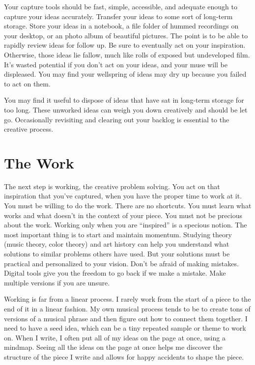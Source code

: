 \documentclass[
]{book}
\begin{document}
Your capture tools should be fast, simple, accessible, and adequate enough to capture your ideas accurately. Transfer your ideas to some sort of long-term storage. Store your ideas in a notebook, a file folder of hummed recordings on your desktop, or an photo album of beautiful pictures. The point is to be able to rapidly review ideas for follow up. Be sure to eventually act on your inspiration. Otherwise, those ideas lie fallow, much like rolls of exposed but undeveloped film. It's wasted potential if you don't act on your ideas, and your muse will be displeased. You may find your wellspring of ideas may dry up because you failed to act on them.

You may find it useful to dispose of ideas that have sat in long-term storage for too long. These unworked ideas can weigh you down creatively and should be let go. Occasionally revisiting and clearing out your backlog is essential to the creative process.

\hypertarget{the-work}{%
\section{The Work}\label{the-work}}

The next step is working, the creative problem solving. You act on that inspiration that you've captured, when you have the proper time to work at it. You must be willing to do the work. There are no shortcuts. You must learn what works and what doesn't in the context of your piece. You must not be precious about the work. Working only when you are ``inspired'' is a specious notion. The most important thing is to start and maintain momentum. Studying theory (music theory, color theory) and art history can help you understand what solutions to similar problems others have used. But your solutions must be practical and personalized to your vision. Don't be afraid of making mistakes. Digital tools give you the freedom to go back if we make a mistake. Make multiple versions if you are unsure.

Working is far from a linear process. I rarely work from the start of a piece to the end of it in a linear fashion. My own musical process tends to be to create tons of versions of a musical phrase and then figure out how to connect them together. I need to have a seed idea, which can be a tiny repeated sample or theme to work on. When I write, I often put all of my ideas on the page at once, using a mindmap. Seeing all the ideas on the page at once helps me discover the structure of the piece I write and allows for happy accidents to shape the piece.
\end{document}
